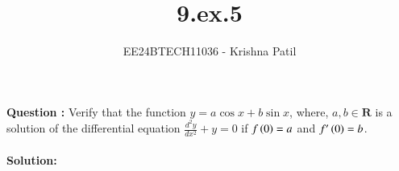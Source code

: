 \documentclass[journal]{IEEEtran}
\begin{document}

\vspace{3cm}

\title{9.ex.5}
\author{EE24BTECH11036 - Krishna Patil}
{\let\newpage\relax\maketitle}

\renewcommand{\thefigure}{\theenumi}
\renewcommand{\thetable}{\theenumi}
\setlength{\intextsep}{10pt} %

\textbf{Question :} Verify that the function $ y = a \cos{x} + b \sin{x} $, where, $ a, b \in \mathbf{R} $ is a solution of the differential equation 
$ \frac{d^2y}{dx^2} + y = 0 $ if $f\left(0\right)=a$ and $f^{\prime}\left(0\right)=b$.\\ \\

\textbf{Solution:}
\end{document}
